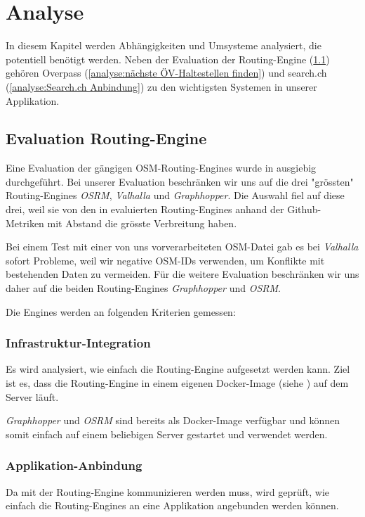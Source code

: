 \section{Analyse}
\label{sec:Analyse}

In diesem Kapitel werden Abhängigkeiten und Umsysteme analysiert, die potentiell benötigt werden. Neben der Evaluation der Routing-Engine (\ref{analyse:Evaluation Routing-Engine}) gehören Overpass (\ref{analyse:nächste ÖV-Haltestellen finden}) und search.ch (\ref{analyse:Search.ch Anbindung}) zu den wichtigsten Systemen in unserer Applikation.

\subsection{Evaluation Routing-Engine}
\label{analyse:Evaluation Routing-Engine}
Eine Evaluation der gängigen \ac{OSM}-Routing-Engines wurde in \cite{eval_routing_engine} ausgiebig durchgeführt. Bei unserer Evaluation beschränken wir uns auf die drei "grössten" Routing-Engines \emph{OSRM}\cite{osrm}, \emph{Valhalla}\cite{valhalla} und \emph{Graphhopper}\cite{graphhopper}. Die Auswahl fiel auf diese drei, weil sie von den in \cite{eval_routing_engine} evaluierten Routing-Engines anhand der Github-Metriken mit Abstand die grösste Verbreitung haben.

Bei einem Test mit einer von uns vorverarbeiteten \ac{OSM}-Datei gab es bei \emph{Valhalla} sofort Probleme, weil wir negative \ac{OSM}-IDs verwenden, um Konflikte mit bestehenden Daten zu vermeiden. Für die weitere Evaluation beschränken wir uns daher auf die beiden Routing-Engines \emph{Graphhopper} und \emph{OSRM}.

Die Engines werden an folgenden Kriterien gemessen:

\subsubsection{Infrastruktur-Integration}
\label{analyse:Infrastruktur-Integration}
Es wird analysiert, wie einfach die Routing-Engine aufgesetzt werden kann. Ziel ist es, dass die Routing-Engine in einem eigenen Docker-Image (siehe ) auf dem Server läuft.

\emph{Graphhopper} und \emph{OSRM} sind bereits als Docker-Image verfügbar und können somit einfach auf einem beliebigen Server gestartet und verwendet werden.


\subsubsection{Applikation-Anbindung}
\label{analyse:Applikation-Anbindung}
Da mit der Routing-Engine kommunizieren werden muss, wird geprüft, wie einfach die Routing-Engines an eine Applikation angebunden werden können.

